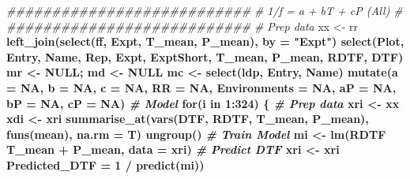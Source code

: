 \documentclass[
]{article}
\newenvironment{Shaded}{\begin{snugshade}}{\end{snugshade}}
\newcommand{\CommentTok}[1]{\textcolor[rgb]{0.56,0.35,0.01}{\textit{#1}}}
\newcommand{\ControlFlowTok}[1]{\textcolor[rgb]{0.13,0.29,0.53}{\textbf{#1}}}
\newcommand{\DataTypeTok}[1]{\textcolor[rgb]{0.13,0.29,0.53}{#1}}
\newcommand{\DecValTok}[1]{\textcolor[rgb]{0.00,0.00,0.81}{#1}}
\newcommand{\KeywordTok}[1]{\textcolor[rgb]{0.13,0.29,0.53}{\textbf{#1}}}
\newcommand{\NormalTok}[1]{#1}
\newcommand{\OperatorTok}[1]{\textcolor[rgb]{0.81,0.36,0.00}{\textbf{#1}}}
\newcommand{\OtherTok}[1]{\textcolor[rgb]{0.56,0.35,0.01}{#1}}
\newcommand{\StringTok}[1]{\textcolor[rgb]{0.31,0.60,0.02}{#1}}
\begin{document}
\begin{Shaded}
\begin{Highlighting}[]
\CommentTok{###########################}
\CommentTok{# 1/f = a + bT + cP (All) #}
\CommentTok{###########################}
\CommentTok{# Prep data}
\NormalTok{xx <-}\StringTok{ }\NormalTok{rr }\OperatorTok{%
\StringTok{  }\KeywordTok{left_join}\NormalTok{(}\KeywordTok{select}\NormalTok{(ff, Expt, T_mean, P_mean), }\DataTypeTok{by =} \StringTok{"Expt"}\NormalTok{) }\OperatorTok{%
\StringTok{  }\KeywordTok{select}\NormalTok{(Plot, Entry, Name, Rep, Expt, ExptShort, T_mean, P_mean, RDTF, DTF)}
\NormalTok{mr <-}\StringTok{ }\OtherTok{NULL}\NormalTok{; md <-}\StringTok{ }\OtherTok{NULL}
\NormalTok{mc <-}\StringTok{ }\KeywordTok{select}\NormalTok{(ldp, Entry, Name) }\OperatorTok{%
\StringTok{  }\KeywordTok{mutate}\NormalTok{(}\DataTypeTok{a =} \OtherTok{NA}\NormalTok{, }\DataTypeTok{b =} \OtherTok{NA}\NormalTok{, }\DataTypeTok{c =} \OtherTok{NA}\NormalTok{, }\DataTypeTok{RR =} \OtherTok{NA}\NormalTok{, }\DataTypeTok{Environments =} \OtherTok{NA}\NormalTok{, }
         \DataTypeTok{aP =} \OtherTok{NA}\NormalTok{, }\DataTypeTok{bP =} \OtherTok{NA}\NormalTok{, }\DataTypeTok{cP =} \OtherTok{NA}\NormalTok{)}
\CommentTok{# Model}
\ControlFlowTok{for}\NormalTok{(i }\ControlFlowTok{in} \DecValTok{1}\OperatorTok{:}\DecValTok{324}\NormalTok{) \{}
  \CommentTok{# Prep data}
\NormalTok{  xri <-}\StringTok{ }\NormalTok{xx }\OperatorTok{%
\NormalTok{  xdi <-}\StringTok{ }\NormalTok{xri }\OperatorTok{%
\StringTok{    }\KeywordTok{summarise_at}\NormalTok{(}\KeywordTok{vars}\NormalTok{(DTF, RDTF, T_mean, P_mean), }\KeywordTok{funs}\NormalTok{(mean), }\DataTypeTok{na.rm =}\NormalTok{ T) }\OperatorTok{%
\StringTok{    }\KeywordTok{ungroup}\NormalTok{()}
  \CommentTok{# Train Model}
\NormalTok{  mi <-}\StringTok{ }\KeywordTok{lm}\NormalTok{(RDTF }\OperatorTok{~}\StringTok{ }\NormalTok{T_mean }\OperatorTok{+}\StringTok{ }\NormalTok{P_mean, }\DataTypeTok{data =}\NormalTok{ xri)}
  \CommentTok{# Predict DTF}
\NormalTok{  xri <-}\StringTok{ }\NormalTok{xri }\OperatorTok{%
                        \DataTypeTok{Predicted_DTF =} \DecValTok{1} \OperatorTok{/}\StringTok{ }\KeywordTok{predict}\NormalTok{(mi))}
}}}}}}}
\end{Highlighting}
\end{Shaded}
\end{document}
